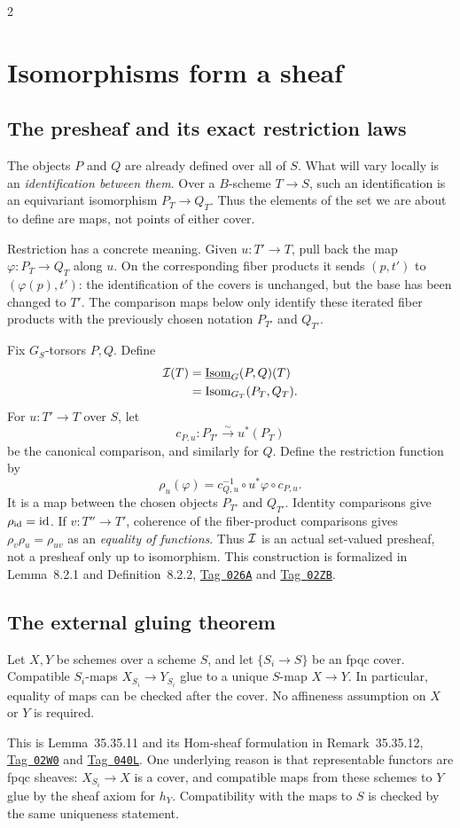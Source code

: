 \documentclass[12pt]{memoir}
\newcommand{\BGtag}[1]{\href{https://stacks.math.columbia.edu/tag/#1}{Tag~\texttt{#1}}}
\begin{document}
\begin{multicols}{2}
\section{Isomorphisms form a sheaf}\label{sec:isomsheaf}

\subsection{The presheaf and its exact restriction laws}
The objects $P$ and $Q$ are already defined over all of $S$. What will
vary locally is an \emph{identification between them}. Over a
$B$-scheme $T\to S$, such an identification is an equivariant
isomorphism $P_T\to Q_T$. Thus the elements of the set we are about
to define are maps, not points of either cover.

Restriction has a concrete meaning. Given $u:T'\to T$, pull back the
map $\varphi:P_T\to Q_T$ along $u$. On the corresponding fiber
products it sends $(p,t')$ to $(\varphi(p),t')$: the identification of
the covers is unchanged, but the base has been changed to $T'$.
The comparison maps below only identify these iterated fiber products
with the previously chosen notation $P_{T'}$ and $Q_{T'}$.

Fix $G_S$-torsors $P,Q$. Define
\[
\begin{aligned}
 \mathcal{I}(T)&=\underline{\operatorname{Isom}}_G(P,Q)(T)\\
       &=\operatorname{Isom}_{G_T}(P_T,Q_T).
\end{aligned}
\]
For $u:T'\to T$ over $S$, let
\[
 c_{P,u}:P_{T'}\xrightarrow{\sim}u^*(P_T)
\]
be the canonical comparison, and similarly for $Q$. Define the
restriction function by
\[
 \rho_u(\varphi)=c_{Q,u}^{-1}\circ u^*\varphi\circ c_{P,u}.
\]
It is a map between the chosen objects $P_{T'}$ and $Q_{T'}$.
Identity comparisons give $\rho_{\operatorname{id}}=\operatorname{id}$. If $v:T''\to T'$, coherence
of the fiber-product comparisons gives
$\rho_v\rho_u=\rho_{uv}$ as an \emph{equality of functions}. Thus
$\mathcal{I}$ is an actual set-valued presheaf, not a presheaf only up to
isomorphism. This construction is formalized in Lemma~8.2.1 and
Definition~8.2.2, \BGtag{026A} and \BGtag{02ZB}.

\subsection{The external gluing theorem}
\begin{Th}\label{th:homdescent}
Let $X,Y$ be schemes over a scheme $S$, and let $\{S_i\to S\}$ be an
fpqc cover. Compatible $S_i$-maps $X_{S_i}\to Y_{S_i}$ glue to a unique
$S$-map $X\to Y$. In particular, equality of maps can be checked after
the cover. No affineness assumption on $X$ or $Y$ is required.
\end{Th}
This is Lemma~35.35.11 and its Hom-sheaf formulation in
Remark~35.35.12, \BGtag{02W0} and \BGtag{040L}. One underlying reason
is that representable functors are fpqc sheaves: $X_{S_i}\to X$ is a
cover, and compatible maps from these schemes to $Y$ glue by the sheaf
axiom for $h_Y$. Compatibility with the maps to $S$ is checked by the
same uniqueness statement.


\end{multicols}
\end{document}
